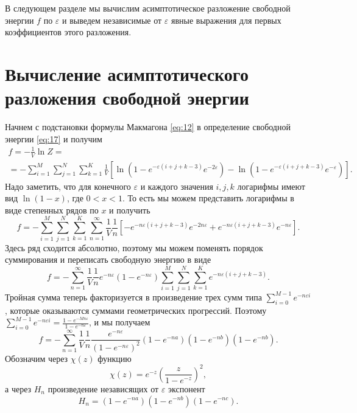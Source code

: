 \documentclass{article}
\begin{document}
В следующем разделе мы вычислим асимптотическое разложение свободной энергии $f$ по $\varepsilon$ и
выведем независимые от  $\varepsilon$ явные выражения для первых коэффициентов этого разложения.
  
\section{Вычисление асимптотического разложения свободной энергии}
\label{sec:free-energy-scaling}
Начнем с подстановки формулы Макмагона \eqref{eq:12} в определение свободной энергии \eqref{eq:17} и получим
\begin{multline}
  \label{eq:20}
    f=-\frac{1}{V}\ln Z =\\=- \sum_{i=1}^{M} \sum_{j=1}^{N} \sum_{k=1}^{K} \frac{1}{V}\left[
  \ln\left(1-e^{-\varepsilon (i+j+k-3)} e^{-2\varepsilon}\right) -\ln\left(1-e^{-\varepsilon
      (i+j+k-3)} e^{-\varepsilon}\right)\right].
\end{multline}
Надо заметить, что для конечного  $\varepsilon$ и каждого значения  $i,j,k$ логарифмы имеют вид
$\ln(1-x)$, где $0<x<1$. То есть мы можем представить логарифмы в виде степенных рядов по $x$ и получить
\begin{equation}
  \label{eq:7}
  f=-\sum_{i=1}^{M} \sum_{j=1}^{N} \sum_{k=1}^{K}\sum_{n=1}^{\infty}
  \frac{1}{V}\frac{1}{n}\left[-e^{-n\varepsilon (i+j+k-3)} e^{-2n\varepsilon}+e^{-n\varepsilon
      (i+j+k-3)} e^{-n\varepsilon}\right]. 
\end{equation}
Здесь ряд сходится абсолютно, поэтому мы можем поменять порядок суммирования и переписать свободную
энергию в виде
\begin{equation}
  \label{eq:37}
  f=-\sum_{n=1}^{\infty}
  \frac{1}{V}\frac{1}{n}e^{-n\varepsilon}\left(1-e^{-n\varepsilon}\right)\sum_{i=1}^{M}
  \sum_{j=1}^{N} \sum_{k=1}^{K}e^{-n\varepsilon (i+j+k-3)} .
\end{equation}
Тройная сумма теперь факторизуется в произведение трех сумм типа  $\sum_{i=0}^{M-1}e^{-n\varepsilon
  i}$, которые оказываются суммами геометрических прогрессий. Поэтому  $\sum_{i=0}^{M-1}e^{-n\varepsilon
  i}=\frac{1-e^{-Mn\varepsilon}}{1-e^{-n\varepsilon}}$, и мы получаем
\begin{equation}
  \label{eq:38}
  f=-\sum_{n=1}^{\infty}
  \frac{1}{V}\frac{1}{n}\frac{e^{-n\varepsilon}}{\left(1-e^{-n\varepsilon}\right)^{2}}
  \left(1-e^{-na}\right)\left(1-e^{-nb}\right)\left(1-e^{-nb}\right).
\end{equation}
Обозначим через  $\chi(z)$ функцию
\begin{equation}
  \label{eq:39}
  \chi(z)=e^{-z}\left(\frac{z}{1-e^{-z}}\right)^{2}, 
\end{equation}
а через  $H_{n}$ произведение независящих от $\varepsilon$ экспонент
\begin{equation}
  \label{eq:40}
  H_{n}=\left(1-e^{-na}\right)\left(1-e^{-nb}\right)\left(1-e^{-nc}\right).
\end{equation}
\end{document}
